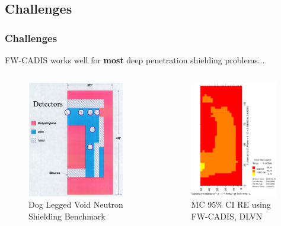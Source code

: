 \documentclass[xcolor=x11names,compress]{beamer}
\renewcommand{\(}{\begin{columns}}
\renewcommand{\)}{\end{columns}}
\newcommand{\<}[1]{\begin{column}{#1}}
\renewcommand{\>}{\end{column}}
\begin{document}
\subsection{Challenges}
\begin{frame}[fragile]
  \frametitle{Challenges}

	FW-CADIS works well for \textbf{most} deep penetration
	shielding problems...
	\begin{columns}
  	\begin{column}{0.5\textwidth}
  	\begin{figure}
  	\begin{center}
  		\includegraphics[height=2in,clip]{dlvn}
		\caption{Dog Legged Void Neutron Shielding Benchmark}
	\end{center}
  	\end{figure}
  	\end{column}
 	\begin{column}{0.5\textwidth}
 	\begin{figure}
  	\begin{center}
  		\includegraphics[height=2in,clip]{dlvn-lowVR}
  		\caption{MC 95\% CI RE using FW-CADIS, DLVN}
  	\end{center}
  	\end{figure}
  	\end{column}
	\end{columns}
  
\end{frame}
\end{document}

